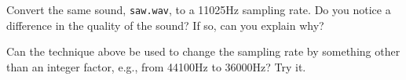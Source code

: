 \begin{problem}
Convert the same sound, \texttt{saw.wav}, to a 11025Hz sampling rate. Do you notice a difference in the quality of the sound? If so, can you explain why?
\end{problem}

\begin{problem}
Can the technique above be used to change the sampling rate by something other than an integer factor, e.g., from 44100Hz to 36000Hz? Try it.
\end{problem}

\let\undefined\x
\let\undefined\q
\let\undefined\p
\let\undefined\v

